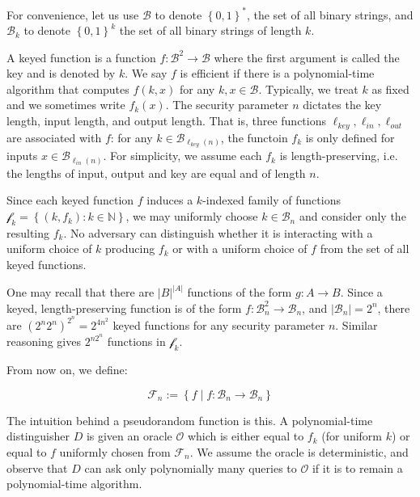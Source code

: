 \documentclass[a4paper, 12pt]{article}
\begin{document}
For convenience, let us use $\mathcal{B}$ to denote 
$\left\{ 0,1 \right\}^{*} $, the set of all 
binary strings, and $\mathcal{B}_k$ to denote 
$\left\{ 0, 1 \right\}^{k} $ the set 
of all binary strings of length $k$.

A keyed function is a function $f : \mathcal{B}^2 \to \mathcal{B}$ where the
first argument is called the key and is denoted by $k$. We say $f$ is
efficient if there is a polynomial-time algorithm that computes $f(k, x)$ for
any $k, x \in \mathcal{B}$. Typically, we treat $k$ as fixed and we sometimes
write $f_k(x)$. The security parameter $n$ dictates 
the key length, input length, and output length.
That is, three functions $\ell_{key}, \ell_{in}, \ell_{out}$
are associated with $f$: for any $k \in \mathcal{B}_{\ell_{key}(n)}$,
the functoin $f_k$ is only defined for inputs 
$x \in \mathcal{B}_{\ell_{in}(n)}$. For simplicity,
we assume each $f_k$ is length-preserving, i.e. the 
lengths of input, output and key are equal and of 
length $n$.

Since each keyed function $f$ induces a $k$-indexed family 
of functions $\mathcal{f}_k = \left\{ (k, f_k) : k \in \mathbb{N} \right\} $, we may uniformly choose $k \in \mathcal{B}_n$ and consider 
only the resulting $f_k$. No adversary can distinguish 
whether it is interacting with a uniform choice of $k$
producing $f_k$ or with a uniform choice of $f$ from 
the set of all keyed functions.

One may recall that there are $|B|^{|A|}$ functions of 
the form $g : A \to B$. Since a keyed, length-preserving function
is of the form $f : \mathcal{B}_n^2 \to \mathcal{B}_n$,
and $|\mathcal{B}_n| = 2^n$, there are $( 2^{n}2^{n} )^{2^n} = 2^{4n^2}$
keyed functions for any security parameter $n$. Similar reasoning 
gives $2^{n 2^n}$ functions in $\mathcal{f}_k$.

From now on, we define:

\begin{equation*}
    \mathcal{F}_n := \left\{ f \mid f : \mathcal{B}_n \to \mathcal{B}_n \right\} 
\end{equation*}

The intuition behind a pseudorandom function is this. A polynomial-time
distinguisher $D$ is given an oracle $\mathcal{O}$ which is either equal 
to $f_k$ (for uniform $k$) or equal to $f$ uniformly chosen from $\mathcal{F}_n$.
We assume the oracle is deterministic, and observe that $D$ can 
ask only polynomially many queries to $\mathcal{O}$ if it is to remain 
a polynomial-time algorithm.
\end{document}
